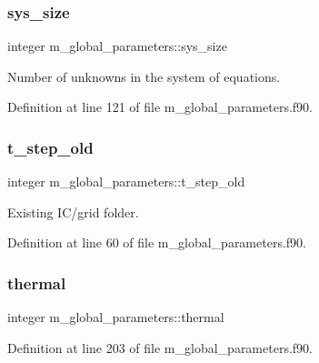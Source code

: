 \subsubsection{\texorpdfstring{sys\+\_\+size}{sys\_size}}
{\footnotesize\ttfamily integer m\+\_\+global\+\_\+parameters\+::sys\+\_\+size}



Number of unknowns in the system of equations. 



Definition at line 121 of file m\+\_\+global\+\_\+parameters.\+f90.

\mbox{\label{namespacem__global__parameters_a5d0554c4fef91acf46f683e8bcd29133}} 
\subsubsection{\texorpdfstring{t\+\_\+step\+\_\+old}{t\_step\_old}}
{\footnotesize\ttfamily integer m\+\_\+global\+\_\+parameters\+::t\+\_\+step\+\_\+old}



Existing I\+C/grid folder. 



Definition at line 60 of file m\+\_\+global\+\_\+parameters.\+f90.

\mbox{\label{namespacem__global__parameters_a17169a5387f8f1efd5ac34cb4eae7c81}} 
\subsubsection{\texorpdfstring{thermal}{thermal}}
{\footnotesize\ttfamily integer m\+\_\+global\+\_\+parameters\+::thermal}



Definition at line 203 of file m\+\_\+global\+\_\+parameters.\+f90.

\mbox{\label{namespacem__global__parameters_aa77b0836fe22478b69e10e656ef7fcc2}} 
